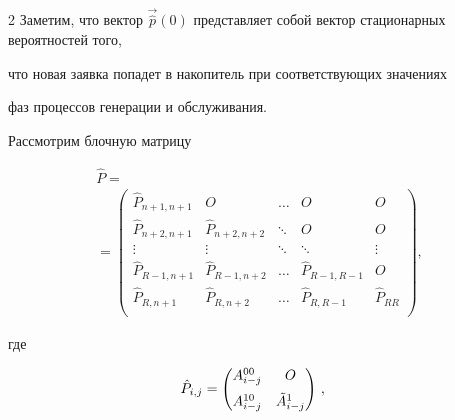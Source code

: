 \begin{multicols}{2}
Заметим, что вектор $\vec{\hat p}(0)$ представляет собой вектор стационарных вероятностей того,


что новая заявка попадет в накопитель при соответствующих значениях


фаз процессов генерации и обслуживания.





Рассмотрим блочную матрицу


\begin{multline}


\label{hat_P}


\hat P={}\\


{}=


\begin{pmatrix}


\hat P_{n+1,n+1}\!\! &\!\! O      \!\!          &\!\! \ldots\!\! &\!\! O \!\!               &\!\! O\\


\hat P_{n+2,n+1}\!\! &\!\! \hat P_{n+2,n+2}\!\! &\!\! \ddots\!\! &\!\! O   \!\!             &\!\! O\\


\vdots          \!\! &\!\! \vdots          \!\! &\!\! \ddots\!\! &\!\! \ddots\!\!                &\!\! \vdots\\


\hat P_{R-1,n+1}\!\! & \!\! \hat P_{R-1,n+2}\!\! &\!\! \ldots\!\! &\!\! \hat P_{R-1,R-1}\!\! &\!\! O\\


\hat P_{R,n+1}  \!\! & \!\! \hat P_{R,n+2}  \!\! &\!\! \ldots\!\! &\!\! \hat P_{R,R-1}  \!\! &\!\! \hat P_{RR}\\


\end{pmatrix},


\end{multline}


где


\begin{align*}


\hat P_{i,j}&=


\begin{pmatrix}


A^{00}_{i-j} & O \\[6pt]


A^{10}_{i-j} & \Tilde A^{1}_{i-j} \\


\end{pmatrix}\,, 



\end{align*}
\end{multicols}
